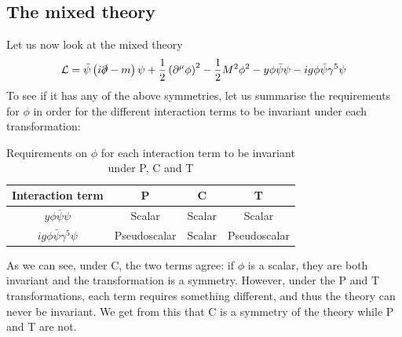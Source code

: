 \documentclass{article}
\begin{document}
\subsection{The mixed theory}
Let us now look at the mixed theory
\begin{equation}
    \mathcal{L} = \bar{\psi}\left(i\slashed{\partial} - m\right)\psi +
    \frac{1}{2}\left(\partial^\mu\phi\right)^2 -
    \frac{1}{2}M^2\phi^2 -
    y\phi\bar{\psi}\psi -
    ig\phi\bar{\psi}\gamma^5\psi
\end{equation}
To see if it has any of the above symmetries, let us summarise the requirements for $\phi$ in order for the different interaction terms to be invariant under each transformation:
\begin{table}
    \centering
    \begin{tabular}{|c|c|c|c|}
        \hline
        Interaction term & P & C & T \\
        \hline
        $y\phi\bar{\psi}\psi$ & Scalar & Scalar & Scalar \\
        \hline
        $ig\phi\bar{\psi}\gamma^5\psi$ & Pseudoscalar & Scalar & Pseudoscalar \\
        \hline
    \end{tabular}
    \caption{Requirements on $\phi$ for each interaction term to be invariant under P, C and T}
    \label{tab:symmetries-yukawa}
\end{table}
As we can see, under C, the two terms agree: if $\phi$ is a scalar, they are both invariant and the transformation is a symmetry. However, under the P and T transformations, each term requires something different, and thus the theory can never be invariant. We get from this that C is a symmetry of the theory while P and T are not.
\end{document}
